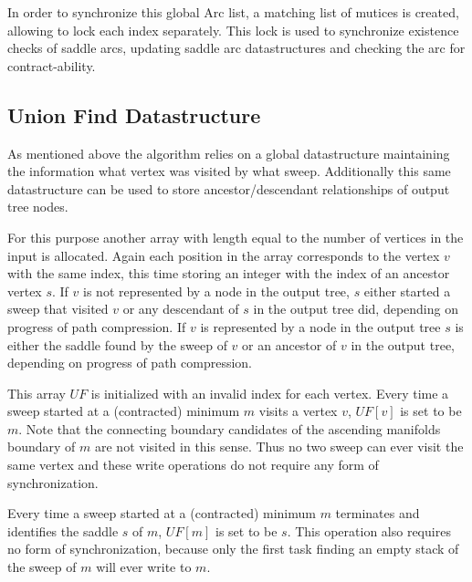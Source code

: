 \documentclass[%
	paper=A4,					%
	twoside=true,				%
	openright,					%
	parskip=full,				%
	chapterprefix=true,			%
	11pt,						%
	headings=normal,			%
	bibliography=totoc,			%
	listof=totoc,				%
	titlepage=on,				%
	captions=tableabove,		%
	draft=false,				%
]{scrreprt}%
\begin{document}
In order to synchronize this global Arc list, a matching list of mutices is created, allowing to lock each index separately. This lock is used to synchronize existence checks of saddle arcs, updating saddle arc datastructures and checking the arc for contract-ability.

\subsection{Union Find Datastructure}
As mentioned above the algorithm relies on a global datastructure maintaining the information what vertex was visited by what sweep. Additionally this same datastructure can be used to store ancestor/descendant relationships of output tree nodes. 

For this purpose another array with length equal to the number of vertices in the input is allocated. Again each position in the array corresponds to the vertex \(v\) with the same index, this time storing an integer with the index of an ancestor vertex \(s\). If \(v\) is not represented by a node in the output tree, \(s\) either started a sweep that visited \(v\) or any descendant of \(s\) in the output tree did, depending on progress of path compression. If \(v\) is represented by a node in the output tree \(s\) is either the saddle found by the sweep of \(v\) or an ancestor of \(v\) in the output tree, depending on progress of path compression. 

This array \(UF\) is initialized with an invalid index for each vertex. Every time a sweep started at a (contracted) minimum \(m\) visits a vertex \(v\), \(UF[v]\) is set to be \(m\). Note that the connecting boundary candidates of the ascending manifolds boundary of \(m\) are not visited in this sense. Thus no two sweep can ever visit the same vertex and these write operations do not require any form of synchronization. 

Every time a sweep started at a (contracted) minimum \(m\) terminates and identifies the saddle \(s\) of \(m\), \(UF[m]\) is set to be \(s\). This operation also requires no form of synchronization, because only the first task finding an empty stack of the sweep of \(m\) will ever write to \(m\).
\end{document}
